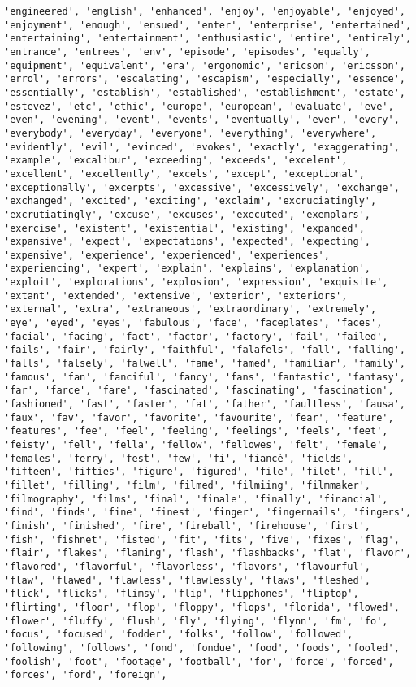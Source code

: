 \documentclass[11pt]{article}
\begin{document}
\begin{Verbatim}[commandchars=\\\{\}]
'engineered', 'english', 'enhanced', 'enjoy', 'enjoyable', 'enjoyed', 'enjoyment', 'enough', 'ensued', 'enter', 'enterprise', 'entertained', 'entertaining', 'entertainment', 'enthusiastic', 'entire', 'entirely', 'entrance', 'entrees', 'env', 'episode', 'episodes', 'equally', 'equipment', 'equivalent', 'era', 'ergonomic', 'ericson', 'ericsson', 'errol', 'errors', 'escalating', 'escapism', 'especially', 'essence', 'essentially', 'establish', 'established', 'establishment', 'estate', 'estevez', 'etc', 'ethic', 'europe', 'european', 'evaluate', 'eve', 'even', 'evening', 'event', 'events', 'eventually', 'ever', 'every', 'everybody', 'everyday', 'everyone', 'everything', 'everywhere', 'evidently', 'evil', 'evinced', 'evokes', 'exactly', 'exaggerating', 'example', 'excalibur', 'exceeding', 'exceeds', 'excelent', 'excellent', 'excellently', 'excels', 'except', 'exceptional', 'exceptionally', 'excerpts', 'excessive', 'excessively', 'exchange', 'exchanged', 'excited', 'exciting', 'exclaim', 'excruciatingly', 'excrutiatingly', 'excuse', 'excuses', 'executed', 'exemplars', 'exercise', 'existent', 'existential', 'existing', 'expanded', 'expansive', 'expect', 'expectations', 'expected', 'expecting', 'expensive', 'experience', 'experienced', 'experiences', 'experiencing', 'expert', 'explain', 'explains', 'explanation', 'exploit', 'explorations', 'explosion', 'expression', 'exquisite', 'extant', 'extended', 'extensive', 'exterior', 'exteriors', 'external', 'extra', 'extraneous', 'extraordinary', 'extremely', 'eye', 'eyed', 'eyes', 'fabulous', 'face', 'faceplates', 'faces', 'facial', 'facing', 'fact', 'factor', 'factory', 'fail', 'failed', 'fails', 'fair', 'fairly', 'faithful', 'falafels', 'fall', 'falling', 'falls', 'falsely', 'falwell', 'fame', 'famed', 'familiar', 'family', 'famous', 'fan', 'fanciful', 'fancy', 'fans', 'fantastic', 'fantasy', 'far', 'farce', 'fare', 'fascinated', 'fascinating', 'fascination', 'fashioned', 'fast', 'faster', 'fat', 'father', 'faultless', 'fausa', 'faux', 'fav', 'favor', 'favorite', 'favourite', 'fear', 'feature', 'features', 'fee', 'feel', 'feeling', 'feelings', 'feels', 'feet', 'feisty', 'fell', 'fella', 'fellow', 'fellowes', 'felt', 'female', 'females', 'ferry', 'fest', 'few', 'fi', 'fiancé', 'fields', 'fifteen', 'fifties', 'figure', 'figured', 'file', 'filet', 'fill', 'fillet', 'filling', 'film', 'filmed', 'filmiing', 'filmmaker', 'filmography', 'films', 'final', 'finale', 'finally', 'financial', 'find', 'finds', 'fine', 'finest', 'finger', 'fingernails', 'fingers', 'finish', 'finished', 'fire', 'fireball', 'firehouse', 'first', 'fish', 'fishnet', 'fisted', 'fit', 'fits', 'five', 'fixes', 'flag', 'flair', 'flakes', 'flaming', 'flash', 'flashbacks', 'flat', 'flavor', 'flavored', 'flavorful', 'flavorless', 'flavors', 'flavourful', 'flaw', 'flawed', 'flawless', 'flawlessly', 'flaws', 'fleshed', 'flick', 'flicks', 'flimsy', 'flip', 'flipphones', 'fliptop', 'flirting', 'floor', 'flop', 'floppy', 'flops', 'florida', 'flowed', 'flower', 'fluffy', 'flush', 'fly', 'flying', 'flynn', 'fm', 'fo', 'focus', 'focused', 'fodder', 'folks', 'follow', 'followed', 'following', 'follows', 'fond', 'fondue', 'food', 'foods', 'fooled', 'foolish', 'foot', 'footage', 'football', 'for', 'force', 'forced', 'forces', 'ford', 'foreign', 
\end{Verbatim}
\end{document}
